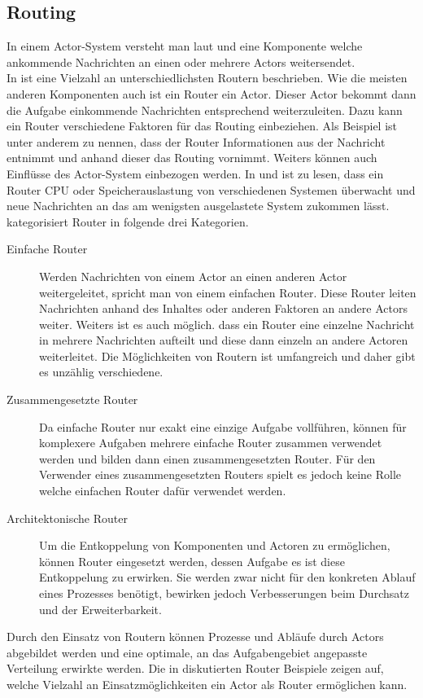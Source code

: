 \subsection{Routing}\label{sec:actor:patterns:routing}
In einem Actor-System versteht man laut \cite{Vernon2015ReactiveAkka} und \cite{kuhn2017reactive} eine Komponente welche ankommende Nachrichten an einen oder mehrere Actors weitersendet. \\
In \cite{Vernon2015ReactiveAkka} ist eine Vielzahl an unterschiedlichsten Routern beschrieben. Wie die meisten anderen Komponenten auch ist ein Router ein Actor. Dieser Actor bekommt dann die Aufgabe einkommende Nachrichten entsprechend weiterzuleiten. Dazu kann ein Router verschiedene Faktoren für das Routing einbeziehen. Als Beispiel ist unter anderem zu nennen, dass der Router Informationen aus der Nachricht entnimmt und anhand dieser das Routing vornimmt. Weiters können auch Einflüsse des Actor-System einbezogen werden. In \cite{Vernon2015ReactiveAkka} und \cite{Akka.netCommunityAkka.NETDocumentation} ist zu lesen, dass ein Router CPU oder Speicherauslastung von verschiedenen Systemen überwacht und neue Nachrichten an das am wenigsten ausgelastete System zukommen lässt. \\
\cite{Vernon2015ReactiveAkka} kategorisiert Router in folgende drei Kategorien. 
\begin{description}
  \item[Einfache Router] Werden Nachrichten von einem Actor an einen anderen Actor weitergeleitet, spricht man von einem einfachen Router. Diese Router leiten Nachrichten anhand des Inhaltes oder anderen Faktoren an andere Actors weiter. Weiters ist es auch möglich. dass ein Router eine einzelne Nachricht in mehrere Nachrichten aufteilt und diese dann einzeln an andere Actoren weiterleitet. Die Möglichkeiten von Routern ist umfangreich und daher gibt es unzählig verschiedene.
  \item[Zusammengesetzte Router] Da einfache Router nur exakt eine einzige Aufgabe vollführen, können für komplexere Aufgaben mehrere einfache Router zusammen verwendet werden und bilden dann einen zusammengesetzten Router. Für den Verwender eines zusammengesetzten Routers spielt es jedoch keine Rolle welche einfachen Router dafür verwendet werden.
  \item[Architektonische Router] Um die Entkoppelung von Komponenten und Actoren zu ermöglichen, können Router eingesetzt werden, dessen Aufgabe es ist diese Entkoppelung zu erwirken. Sie werden zwar nicht für den konkreten Ablauf eines Prozesses benötigt, bewirken jedoch Verbesserungen beim Durchsatz und der Erweiterbarkeit. 
\end{description}
Durch den Einsatz von Routern können Prozesse und Abläufe durch Actors abgebildet werden und eine optimale, an das Aufgabengebiet angepasste Verteilung erwirkte werden. Die in \cite{Vernon2015ReactiveAkka} diskutierten Router Beispiele zeigen auf, welche Vielzahl an Einsatzmöglichkeiten ein Actor als Router ermöglichen kann. 

